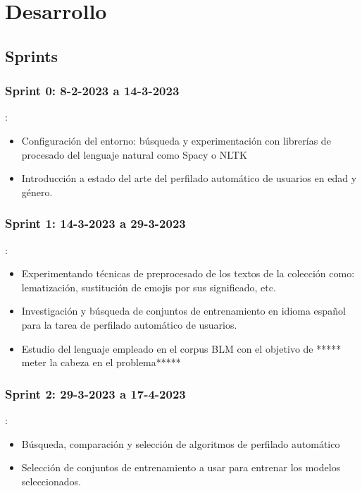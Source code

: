\chapter{Desarrollo}
\label{chap:desarrollo}
\section{Sprints}
\subsection{Sprint 0: 8-2-2023 a 14-3-2023}
:
\begin{itemize}
    \item Configuración del entorno: búsqueda y experimentación con librerías de procesado del lenguaje natural como Spacy o NLTK
    \item Introducción a estado del arte del perfilado automático de usuarios en edad y género.
\end{itemize}

\subsection{Sprint 1: 14-3-2023 a 29-3-2023}
:
\begin{itemize}
    \item Experimentando técnicas de preprocesado de los textos de la colección como: lematización, sustitución de emojis por sus significado, etc.
    \item Investigación y búsqueda de conjuntos de entrenamiento en idioma español para la tarea de perfilado automático de usuarios.
    \item Estudio del lenguaje empleado en el corpus BLM con el objetivo de
    ***** meter la cabeza en el problema*****
\end{itemize}

\subsection{Sprint 2: 29-3-2023 a 17-4-2023}
:
\begin{itemize}
    \item Búsqueda, comparación y selección de algoritmos de perfilado automático
    \item Selección de conjuntos de entrenamiento a usar para entrenar los modelos seleccionados.
\end{itemize}

